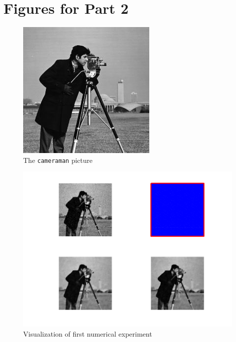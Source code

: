 \documentclass{report}
\begin{document}
\chapter{Figures for Part 2}

\begin{figure}
	\centering
	\includegraphics{cameraman.jpg}
	\caption{The \texttt{cameraman} picture}
	\label{cameraman}
\end{figure}

\begin{figure}
	\centering
	\includegraphics[width=\textwidth]{../out/report_firsttry.png}
	\caption{Visualization of first numerical experiment}
	\label{vis:firsttry}
\end{figure}
\end{document}
